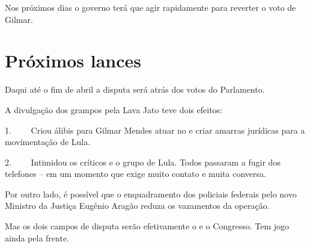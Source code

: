 Nos próximos dias o governo terá que agir rapidamente para reverter o
voto de Gilmar.

\section{Próximos lances}

Daqui até o fim de abril a disputa será atrás dos votos do Parlamento.

A divulgação dos grampos pela Lava Jato teve dois efeitos:

1.~~~~ Criou álibis para Gilmar Mendes atuar no  e criar amarras
jurídicas para a movimentação de Lula.

2.~~~~ Intimidou os críticos e o grupo de Lula. Todos passaram a fugir
dos telefones -- em um momento que exige muito contato e muita conversa.

Por outro lado, é possível que o enquadramento dos policiais federais
pelo novo Ministro da Justiça Eugênio Aragão reduza os vazamentos da
operação.

Mas os dois campos de disputa serão efetivamente o  e o Congresso.
Tem jogo ainda pela frente.
